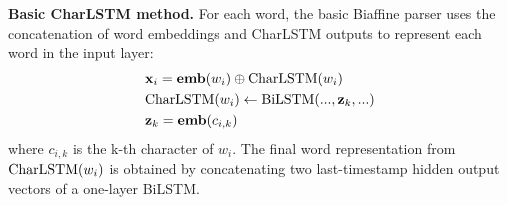 \textbf{Basic CharLSTM method.} For each word, the basic Biaffine parser uses the concatenation of word embeddings and CharLSTM outputs to represent each word in the input layer:
\begin{equation}\label{eq:charlstm-eq}
\begin{split}
& \mathbf{x}_i = \mathbf{emb}(w_i) 
 \oplus \textup{CharLSTM}(w_i) \\
& \textup{CharLSTM}(w_i) \leftarrow \textup{BiLSTM}(...,\mathbf{z}_{k},...) \\
& \mathbf{z}_{k} = \mathbf{emb}(c_{i,k}) 
\end{split}
\end{equation}
where $c_{i,k}$ is the k-th character of $w_i$. The final word representation from $\textup{CharLSTM}(w_i)$ 
is obtained by concatenating two last-timestamp hidden output vectors of a one-layer BiLSTM. 



